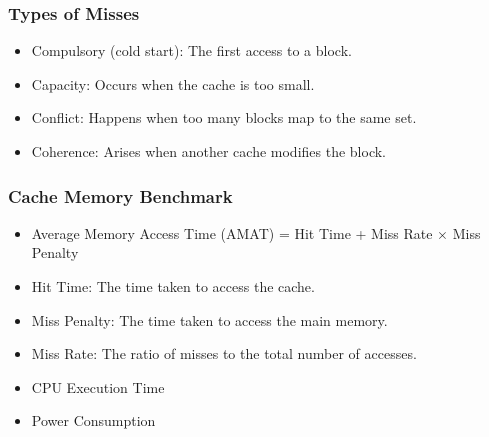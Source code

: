 
\begin{frame}
    \frametitle{Types of Misses}
    \begin{itemize}
        \item Compulsory (cold start): The first access to a block.
        \item Capacity: Occurs when the cache is too small.
        \item Conflict: Happens when too many blocks map to the same set.
        \item Coherence: Arises when another cache modifies the block.
    \end{itemize}
    \note{
    }
\end{frame}


\begin{frame}
    \frametitle{Cache Memory Benchmark}
    \begin{itemize}
        \item Average Memory Access Time (AMAT) = Hit Time + Miss Rate $\times$ Miss Penalty
        \item Hit Time: The time taken to access the cache.
        \item Miss Penalty: The time taken to access the main memory.
        \item Miss Rate: The ratio of misses to the total number of accesses.
        \item CPU Execution Time
        \item Power Consumption
    \end{itemize}
\end{frame}